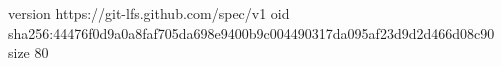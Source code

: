 version https://git-lfs.github.com/spec/v1
oid sha256:44476f0d9a0a8faf705da698e9400b9c004490317da095af23d9d2d466d08c90
size 80
